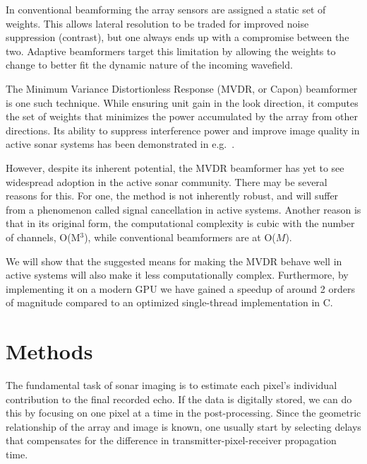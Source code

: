 \documentclass[10pt,a4paper]{article}
\newcommand\1{\vec 1}
\begin{document}
In conventional beamforming the array sensors are assigned a static set of weights. This allows lateral resolution to be traded for improved noise suppression (contrast), but one always ends up with a compromise between the two. Adaptive beamformers target this limitation by allowing the weights to change to better fit the dynamic nature of the incoming wavefield.

The Minimum Variance Distortionless Response (MVDR, or Capon) beamformer is one such technique. While ensuring unit gain in the look direction, it computes the set of weights that minimizes the power accumulated by the array from other directions. Its ability to suppress interference power and improve image quality in active sonar systems has been demonstrated in e.g.~\cite{Blomberg2012a,Blomberg2011,Dursun2009,Lo2004}.

However, despite its inherent potential, the \gls{MVDR} beamformer has yet to see widespread adoption in the active sonar community. There may be several reasons for this. For one, the method is not inherently robust, and will suffer from a phenomenon called signal cancellation in active systems. Another reason is that in its original form, the computational complexity is cubic with the number of channels, O(M$^3$), while conventional beamformers are at O($M$).

We will show that the suggested means for making the \gls{MVDR} behave well in active systems will also make it less computationally complex. Furthermore, by implementing it on a modern \gls{GPU} we have gained a speedup of around 2 orders of magnitude compared to an optimized single-thread implementation in C.




\newpage
\section{Methods}\label{methods}

The fundamental task of sonar imaging is to estimate each pixel's individual contribution to the final recorded echo. If the data is digitally stored, we can do this by focusing on one pixel at a time in the post-processing. Since the geometric relationship of the array and image is known, one usually start by selecting delays that compensates for the difference in transmitter-pixel-receiver propagation time.
\end{document}
